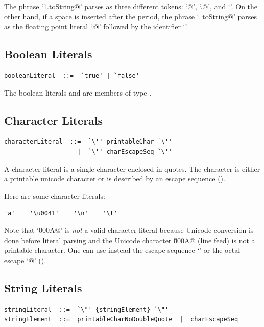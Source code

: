 \example
The phrase `\lstinline@1.toString@' parses as three different tokens:
`@', `\lstinline@.@', and `\lstinline@toString@'. On the
other hand, if a space is inserted after the period, the phrase
`. toString@' parses as the floating point literal
`.@' followed by the identifier `\lstinline@toString@'.






\subsection{Boolean Literals}

\syntax\begin{lstlisting}
booleanLiteral  ::=  `true' | `false'
\end{lstlisting}

The boolean literals \lstinline@true@ and \lstinline@false@ are
members of type \lstinline@Boolean@.

\subsection{Character Literals}

\syntax\begin{lstlisting}
characterLiteral  ::=  `\'' printableChar `\''
                    |  `\'' charEscapeSeq `\''
\end{lstlisting}

A character literal is a single character enclosed in quotes.
The character is either a printable unicode character or is described
by an escape sequence ().

\example
Here are some character literals:
\begin{lstlisting}
'a'    '\u0041'    '\n'    '\t'
\end{lstlisting}
Note that `\lstinline@\u000A@' is {\em not} a valid character literal because
Unicode conversion is done before literal parsing and the Unicode
character \lstinline@\u000A@ (line feed) is not a printable
character. One can use instead the escape sequence `\lstinline@\n@' or
the octal escape `\lstinline@{}@' ().

\subsection{String Literals}\label{sec:string-literals}

\syntax\begin{lstlisting}
stringLiteral  ::=  `\"' {stringElement} `\"'
stringElement  ::=  printableCharNoDoubleQuote  |  charEscapeSeq
\end{lstlisting}

